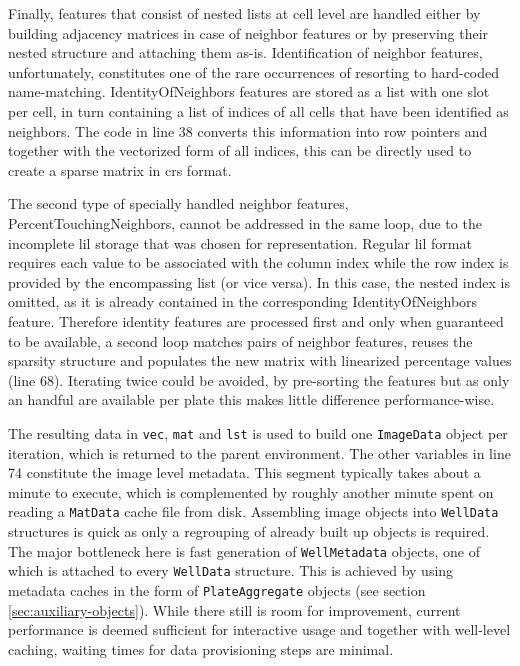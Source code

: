 Finally, features that consist of nested lists at cell level are handled either by building adjacency matrices in case of neighbor features or by preserving their nested structure and attaching them as-is. Identification of neighbor features, unfortunately, constitutes one of the rare occurrences of resorting to hard-coded name-matching. IdentityOfNeighbors features are stored as a list with one slot per cell, in turn containing a list of indices of all cells that have been identified as neighbors. The code in line 38 converts this information into row pointers and together with the vectorized form of all indices, this can be directly used to create a sparse matrix in \gls{crs} format.

The second type of specially handled neighbor features, PercentTouchingNeighbors, cannot be addressed in the same loop, due to the incomplete \gls{lil} storage that was chosen for representation. Regular \gls{lil} format requires each value to be associated with the column index while the row index is provided by the encompassing list (or vice versa). In this case, the nested index is omitted, as it is already contained in the corresponding IdentityOfNeighbors feature. Therefore identity features are processed first and only when guaranteed to be available, a second loop matches pairs of neighbor features, reuses the sparsity structure and populates the new matrix with linearized percentage values (line 68). Iterating twice could be avoided, by pre-sorting the features but as only an handful are available per plate this makes little difference performance-wise.

The resulting data in \texttt{vec}, \texttt{mat} and \texttt{lst} is used to build one \texttt{ImageData} object per iteration, which is returned to the parent environment. The other variables in line 74 constitute the image level metadata. This segment typically takes about a minute to execute, which is complemented by roughly another minute spent on reading a \texttt{MatData} cache file from disk. Assembling image objects into \texttt{WellData} structures is quick as only a regrouping of already built up objects is required. The major bottleneck here is fast generation of \texttt{WellMetadata} objects, one of which is attached to every \texttt{WellData} structure. This is achieved by using metadata caches in the form of \texttt{PlateAggregate} objects (see section \ref{sec:auxiliary-objects}). While there still is room for improvement, current performance is deemed sufficient for interactive usage and together with well-level caching, waiting times for data provisioning steps are minimal.

